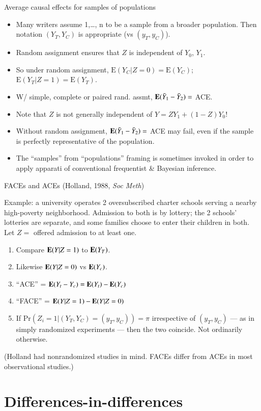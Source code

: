 \begin{frame}{Average causal effects for samples of populations}
  
  \begin{itemize}
  \item Many writers assume 1,\ldots, n to be a sample from a
  broader population. Then notation $(Y_{T}, Y_{C})$ is appropriate
  (vs $(y_{T}, y_{C})$). 
  \item Random assignment ensures that $Z$ is independent of $Y_0$, $Y_1$.
  \item So under random assignment, $\mathrm{E}(Y_C|Z=0) =
  \mathrm{E}(Y_C)$;  $\mathrm{E}(Y_T|Z=1) = \mathrm{E}(Y_T)$.
  \item W/ simple, complete or paired rand. assmt, $\mathbf{E}( \bar{Y}_{1}
  - \bar{Y}_{2}) = $ ACE. 
  \item Note that $Z$ is not generally independent of $Y=ZY_1 +
  (1-Z)Y_0$!
  \item Without random assignment, $\mathbf{E}( \bar{Y}_{1}
  - \bar{Y}_{2}) = $ ACE may fail, even if the sample is perfectly
  representative of the population.
\item The ``samples'' from
  ``populations'' framing is sometimes invoked in order to apply apparati of conventional
  frequentist \& Bayesian inference.
  \end{itemize}
\end{frame}

\begin{frame}{FACEs and ACEs (Holland, 1988, \textit{Soc Meth}) }

Example: a university operates 2 oversubscribed charter schools
serving a nearby high-poverty neighborhood. Admission to both is by
lottery; the 2 schools' lotteries are separate, and some families
choose to enter their children in 
both. Let $Z=$ offered admission to at least one.

  \begin{enumerate}[<+->]
  \item   Compare $\mathbf{E}(Y | Z=1)$ to $\mathbf{E}(Y_{T})$.  
\item Likewise  $\mathbf{E}(Y | Z=0)$ vs $\mathbf{E}(Y_{c})$.
\item ``ACE'' = $\mathbf{E}(Y_t - Y_c) = \mathbf{E}(Y_{t}) - \mathbf{E}(Y_{c})$
\item ``FACE'' = $\mathbf{E}(Y | Z=1) - \mathbf{E}(Y | Z=0)$
\item If $\mathrm{Pr}(Z_{i}=1 | (Y_{T}, Y_{C})=(y_{T}, y_{C})) = \pi$
  irrespective of $(y_{T}, y_{C}) $ --- as in simply randomized
  experiments --- then the two coincide.  
Not ordinarily otherwise.
  \end{enumerate}

\pause

(Holland  had nonrandomized studies in mind.  FACEs differ from ACEs
in most observational studies.)

\end{frame}







\section{Differences-in-differences}


